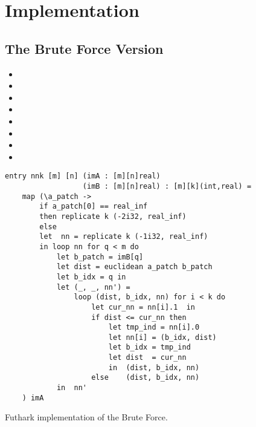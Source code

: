 \section{Implementation}
\label{sec:brute}
\subsection{The Brute Force Version}




\begin{itemize}
	\item 
	\item 
	\item 
	\item 
	\item 
	\item 
	\item 
	\item 
\end{itemize}	




\begin{listing}[H]
\begin{verbatim}
entry nnk [m] [n] (imA : [m][n]real) 
                  (imB : [m][n]real) : [m][k](int,real) =
    map (\a_patch ->
        if a_patch[0] == real_inf
        then replicate k (-2i32, real_inf)
        else
        let  nn = replicate k (-1i32, real_inf)
        in loop nn for q < m do
            let b_patch = imB[q]
            let dist = euclidean a_patch b_patch
            let b_idx = q in
            let (_, _, nn') =
                loop (dist, b_idx, nn) for i < k do
                    let cur_nn = nn[i].1  in
                    if dist <= cur_nn then 
                        let tmp_ind = nn[i].0
                        let nn[i] = (b_idx, dist)
                        let b_idx = tmp_ind
                        let dist  = cur_nn
                        in  (dist, b_idx, nn)
                    else    (dist, b_idx, nn)
            in  nn'
    ) imA 
\end{verbatim}
\caption{Futhark implementation of the Brute Force.}
\label{lst:brute}
\end{listing}


